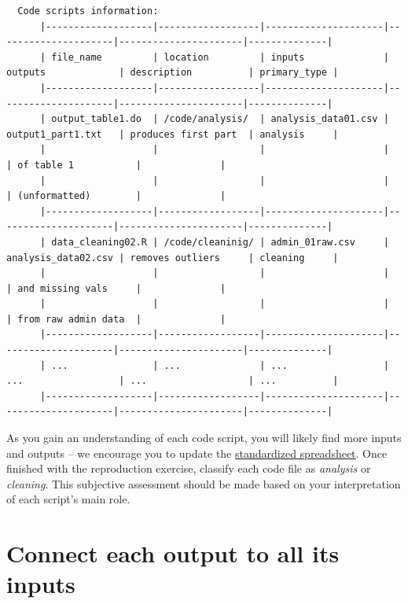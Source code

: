 \documentclass[]{book}
\begin{document}
\begin{verbatim}
  Code scripts information:
      |-------------------|------------------|---------------------|---------------------|----------------------|--------------|
      | file_name         | location         | inputs              | outputs             | description          | primary_type |
      |-------------------|------------------|---------------------|---------------------|----------------------|--------------|
      | output_table1.do  | /code/analysis/  | analysis_data01.csv | output1_part1.txt   | produces first part  | analysis     |
      |                   |                  |                     |                     | of table 1           |              |
      |                   |                  |                     |                     | (unformatted)        |              |
      |-------------------|------------------|---------------------|---------------------|----------------------|--------------|
      | data_cleaning02.R | /code/cleaninig/ | admin_01raw.csv     | analysis_data02.csv | removes outliers     | cleaning     |
      |                   |                  |                     |                     | and missing vals     |              |
      |                   |                  |                     |                     | from raw admin data  |              |
      |-------------------|------------------|---------------------|---------------------|----------------------|--------------|
      | ...               | ...              | ...                 | ...                 | ...                  | ...          |
      |-------------------|------------------|---------------------|---------------------|----------------------|--------------|
\end{verbatim}

As you gain an understanding of each code script, you will likely find more inputs and outputs -- we encourage you to update the \href{https://docs.google.com/spreadsheets/d/1LUIdVFH0OfR70C7z07TYeE-uWzKI_JIeWUMaYhqEKK0/edit\#gid=1617799822\&range=A1}{standardized spreadsheet}. Once finished with the reproduction exercise, classify each code file as \emph{analysis} or \emph{cleaning}. This subjective assessment should be made based on your interpretation of each script's main role.

\hypertarget{diagram}{%
\section{Connect each output to all its inputs}\label{diagram}}
\end{document}
